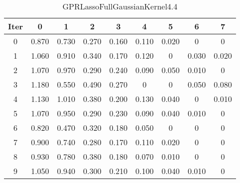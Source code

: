 \begin{table}
	\begin{center}
		\begin{tabular}{|c|c|c|c|c|c|c|c|c|}
			\hline
			Iter & 0 & 1 & 2 & 3 & 4 & 5 & 6 & 7 \\
			\hline
			0 & 0.870 & 0.730 & 0.270 & 0.160 & 0.110 & 0.020 & 0 & 0 \\
			\hline
			1 & 1.060 & 0.910 & 0.340 & 0.170 & 0.120 & 0 & 0.030 & 0.020 \\
			\hline
			2 & 1.070 & 0.970 & 0.290 & 0.240 & 0.090 & 0.050 & 0.010 & 0 \\
			\hline
			3 & 1.180 & 0.550 & 0.490 & 0.270 & 0 & 0 & 0.050 & 0.080 \\
			\hline
			4 & 1.130 & 1.010 & 0.380 & 0.200 & 0.130 & 0.040 & 0 & 0.010 \\
			\hline
			5 & 1.070 & 0.950 & 0.290 & 0.230 & 0.090 & 0.040 & 0.010 & 0 \\
			\hline
			6 & 0.820 & 0.470 & 0.320 & 0.180 & 0.050 & 0 & 0 & 0 \\
			\hline
			7 & 0.900 & 0.740 & 0.280 & 0.170 & 0.110 & 0.020 & 0 & 0 \\
			\hline
			8 & 0.930 & 0.780 & 0.380 & 0.180 & 0.070 & 0.010 & 0 & 0 \\
			\hline
			9 & 1.050 & 0.940 & 0.300 & 0.210 & 0.100 & 0.040 & 0.010 & 0 \\
			\hline
		\end{tabular}
	\end{center}
	\caption{GPRLassoFullGaussianKernel4.4}
\end{table}